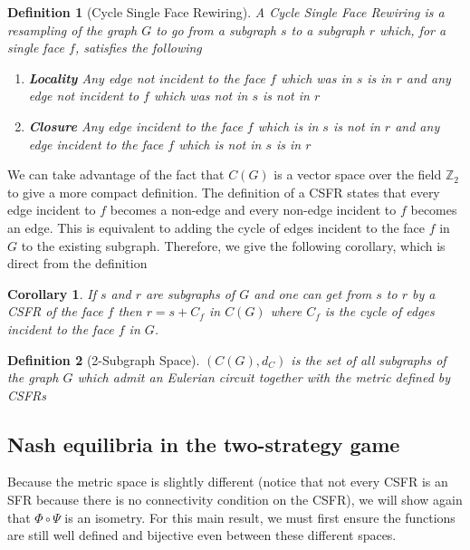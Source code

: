 \documentclass{article}
\newtheorem{definition}{Definition}[section]
\newtheorem{corollary}{Corollary}[section]
\begin{document}
    \begin{definition}[Cycle Single Face Rewiring]
        A Cycle Single Face Rewiring is a resampling of the graph $G$ to go from a subgraph $s$ to a subgraph $r$ which, for a single face $f$, satisfies the following 
        \begin{enumerate}
            \item \textbf{Locality} Any edge not incident to the face $f$ which was in $s$ is in $r$ and any edge not incident to $f$ which was not in $s$ is not in $r$
            \item \textbf{Closure} Any edge incident to the face $f$ which is in $s$ is not in $r$ and any edge incident to the face $f$ which is not in $s$ is in $r$
        \end{enumerate}
    \end{definition}

    We can take advantage of the fact that $C(G)$ is a vector space over the field $\mathbb{Z}_2$ to give a more compact definition. The definition of a CSFR states that every edge incident to $f$ becomes a non-edge and every non-edge incident to $f$ becomes an edge. This is equivalent to adding the cycle of edges incident to the face $f$ in $G$ to the existing subgraph. Therefore, we give the following corollary, which is direct from the definition 

    \begin{corollary}\label{cor:CSFRequiv}
        If $s$ and $r$ are subgraphs of $G$ and one can get from $s$ to $r$ by a CSFR of the face $f$ then $r=s+C_f$ in $C(G)$ where $C_f$ is the cycle of edges incident to the face $f$ in $G$.
    \end{corollary}

    \begin{definition}[2-Subgraph Space]
        $(C(G),d_C)$ is the set of all subgraphs of the graph $G$ which admit an Eulerian circuit together with the metric defined by CSFRs  
    \end{definition}


    \subsection{Nash equilibria in the two-strategy game}
    Because the metric space is slightly different (notice that not every CSFR is an SFR because there is no connectivity condition on the CSFR), we will show again that $\Phi\circ \Psi$ is an isometry.  For this main result, we must first ensure the functions are still well defined and bijective even between these different spaces.
\end{document}

